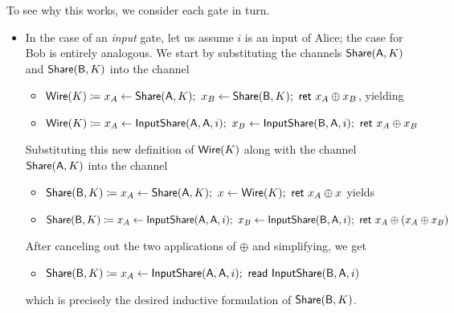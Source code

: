 \noindent To see why this works, we consider each gate in turn.
\begin{itemize}
\item In the case of an \emph{input} gate, let us assume $i$ is an input of Alice; the case for Bob is entirely analogous. We start by substituting the channels $\mathsf{Share}(\mathsf{A},K)$ and $\mathsf{Share}(\mathsf{B},K)$ into the channel
\begin{itemize}
\item $\mathsf{Wire}(K) \coloneqq x_A \leftarrow \mathsf{Share}(\mathsf{A},K); \ x_B \leftarrow \mathsf{Share}(\mathsf{B},K); \ \mathsf{ret} \ x_A \oplus x_B$, yielding
\item $\mathsf{Wire}(K) \coloneqq x_A \leftarrow \mathsf{InputShare}(\mathsf{A},\mathsf{A},i); \ x_B \leftarrow \mathsf{InputShare}(\mathsf{B},\mathsf{A},i); \ \mathsf{ret} \ x_A \oplus x_B$
\end{itemize}
Substituting this new definition of $\mathsf{Wire}(K)$ along with the channel $\mathsf{Share}(\mathsf{A},K)$ into the channel
\begin{itemize}
\item $\mathsf{Share}(\mathsf{B},K) \coloneqq x_A \leftarrow \mathsf{Share}(\mathsf{A},K); \ x \leftarrow \mathsf{Wire}(K); \ \mathsf{ret} \ x_A \oplus x$ yields
\item $\mathsf{Share}(\mathsf{B},K) \coloneqq x_A \leftarrow \mathsf{InputShare}(\mathsf{A},\mathsf{A},i); \ x_B \leftarrow \mathsf{InputShare}(\mathsf{B},\mathsf{A},i); \ \mathsf{ret} \ x_A \oplus (x_A \oplus x_B)$
\end{itemize}
After canceling out the two applications of $\oplus$ and simplifying, we get
\begin{itemize}
\item $\mathsf{Share}(\mathsf{B},K) \coloneqq x_A \leftarrow \mathsf{InputShare}(\mathsf{A},\mathsf{A},i); \ \mathsf{read} \ \mathsf{InputShare}(\mathsf{B},\mathsf{A},i)$
\end{itemize}
which is precisely the desired inductive formulation of $\mathsf{Share}(\mathsf{B},K)$.


\end{itemize}
